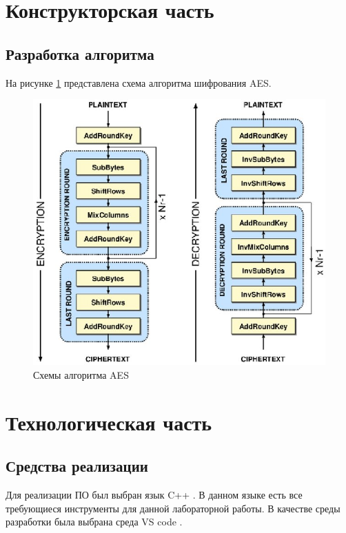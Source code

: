 \clearpage

\section{Конструкторская часть}

\subsection{Разработка алгоритма}

На рисунке \ref{fig:algo} представлена схема алгоритма шифрования AES.

%

\begin{figure}[h!]
	\centering
	\includegraphics[width=\textwidth]{assets/images/AES.jpg}
	\caption{Схемы алгоритма AES}
	\label{fig:algo}
\end{figure}
\clearpage

\section{Технологическая часть}

\subsection{Средства реализации}

Для реализации ПО был выбран язык C++ \cite{c++}.
В данном языке есть все требующиеся инструменты для данной лабораторной работы.
В качестве среды разработки была выбрана среда VS code \cite{vscode}.

